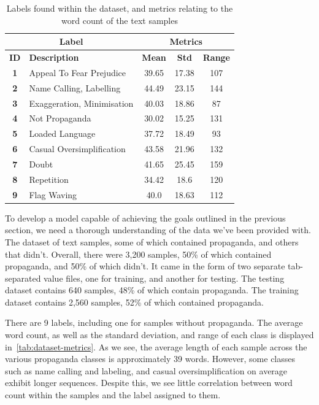 \documentclass[twocolumn]{article}
\begin{document}
\begin{table}[t!]
    \centering
    \begin{tabular}{@{}clccc@{}}
        \toprule
        \multicolumn{2}{c}{\textbf{Label}} & \multicolumn{3}{c}{\textbf{Metrics}} \\ \midrule
        \textbf{ID}& \textbf{Description} & \textbf{Mean} & \textbf{Std} & \textbf{Range} \\ \bottomrule
        \textbf{1} & Appeal To Fear Prejudice & 39.65 & 17.38 & 107 \\
        \textbf{2} & Name Calling, Labelling & 44.49 & 23.15 & 144 \\
        \textbf{3} & Exaggeration, Minimisation & 40.03 & 18.86 & 87 \\
        \textbf{4} & Not Propaganda & 30.02 & 15.25 & 131 \\
        \textbf{5} & Loaded Language & 37.72 & 18.49 & 93 \\
        \textbf{6} & Casual Oversimplification & 43.58 & 21.96 & 132 \\
        \textbf{7} & Doubt & 41.65 & 25.45 & 159 \\
        \textbf{8} & Repetition & 34.42 & 18.6 & 120 \\
        \textbf{9} & Flag Waving & 40.0 & 18.63 & 112 \\ 
        \bottomrule
    \end{tabular}
    \caption{Labels found within the dataset, and metrics relating to the word count of the text samples}
    \label{tab:dataset-metrics}
\end{table}

To develop a model capable of achieving the goals outlined in the previous section, we need a thorough understanding of the data we've been provided with. The dataset of text samples, some of which contained propaganda, and others that didn't. Overall, there were 3,200 samples, 50\% of which contained propaganda, and 50\% of which didn't. It came in the form of two separate tab-separated value files, one for training, and another for testing. The testing dataset contains 640 samples, 48\% of which contain propaganda. The training dataset contains 2,560 samples, 52\% of which contained propaganda. 

There are 9 labels, including one for samples without propaganda. The average word count, as well as the standard deviation, and range of each class is displayed in~\autoref{tab:dataset-metrics}. As we see, the average length of each sample across the various propaganda classes is approximately 39 words. However, some classes such as name calling and labeling, and casual oversimplification on average exhibit longer sequences. Despite this, we see little correlation between word count within the samples and the label assigned to them. 
\end{document}
